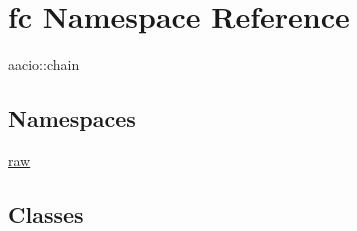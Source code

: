 \hypertarget{namespacefc}{}\section{fc Namespace Reference}
\label{namespacefc}


aacio\+::chain  


\subsection*{Namespaces}
\begin{DoxyCompactItemize}
\item 
 \mbox{\hyperlink{namespacefc_1_1raw}{raw}}
\end{DoxyCompactItemize}
\subsection*{Classes}
